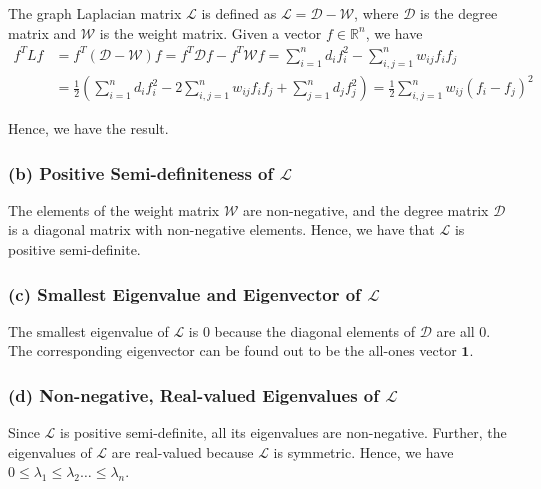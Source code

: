 The graph Laplacian matrix \( \mathcal{L} \) is defined as \( \mathcal{L} = \mathcal{D} - \mathcal{W} \), where \( \mathcal{D} \) is the degree matrix and \( \mathcal{W} \) is the weight matrix.
Given a vector \( f \in \mathbb{R}^{n} \), we have
\begin{align*}
    f^{T} L f
     & =
    f^{T} (\mathcal{D} - \mathcal{W}) f
    = f^{T} \mathcal{D} f - f^{T} \mathcal{W} f
    =
    \sum_{i=1}^{n} d_{i} f_{i}^{2} - \sum_{i, j=1}^{n} w_{i j} f_{i} f_{j}
    \\ & =
    \frac{1}{2} \left( \sum_{i=1}^{n} d_{i} f_{i}^{2} - 2 \sum_{i, j=1}^{n} w_{i j} f_{i} f_{j} + \sum_{j=1}^{n} d_{j} f_{j}^{2} \right)
    =
    \frac{1}{2} \sum_{i, j=1}^{n} w_{i j} (f_{i} - f_{j})^{2}
\end{align*}

Hence, we have the result.

\vspace*{-1em}
\subsubsection*{(b) Positive Semi-definiteness of \( \mathcal{L} \)}

The elements of the weight matrix \( \mathcal{W} \) are non-negative, and the degree matrix \( \mathcal{D} \) is a diagonal matrix with non-negative elements.
Hence, we have that \( \mathcal{L} \) is positive semi-definite.

\vspace*{-1em}
\subsubsection*{(c) Smallest Eigenvalue and Eigenvector of \( \mathcal{L} \)}

The smallest eigenvalue of \( \mathcal{L} \) is 0 because the diagonal elements of \( \mathcal{D} \) are all 0.
The corresponding eigenvector can be found out to be the all-ones vector \( \mathbf{1} \).

\vspace*{-1em}
\subsubsection*{(d) Non-negative, Real-valued Eigenvalues of \( \mathcal{L} \)}

Since \( \mathcal{L} \) is positive semi-definite, all its eigenvalues are non-negative.
Further, the eigenvalues of \( \mathcal{L} \) are real-valued because \( \mathcal{L} \) is symmetric.
Hence, we have \( 0 \leq \lambda_{1} \leq \lambda_{2} \ldots \leq \lambda_{n} \).
